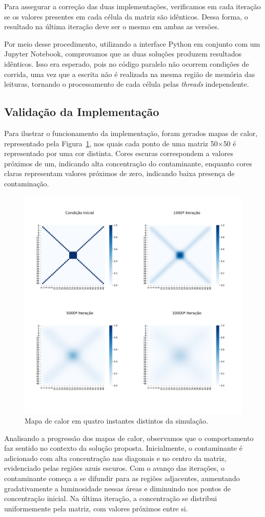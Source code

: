 \documentclass[12pt]{article}
\begin{document}
Para assegurar a correção das duas implementações, verificamos em cada iteração
se os valores presentes em cada célula da matriz são idênticos. Dessa forma, o
resultado na última iteração deve ser o mesmo em ambas as versões.

Por meio desse procedimento, utilizando a interface Python em conjunto com um
Jupyter Notebook, comprovamos que as duas soluções produzem resultados
idênticos. Isso era esperado, pois no código paralelo não ocorrem condições de
corrida, uma vez que a escrita não é realizada na mesma região de memória das
leituras, tornando o processamento de cada célula pelas \textit{threads}
independente.

\subsection{Validação da Implementação}

Para ilustrar o funcionamento da implementação, foram gerados mapas de calor,
representado pela Figura~\ref{fig:heatmap}, nos quais cada ponto de uma matriz
50$\times$50 é representado por uma cor distinta. Cores escuras correspondem a valores
próximos de um, indicando alta concentração do contaminante, enquanto cores
claras representam valores próximos de zero, indicando baixa presença de
contaminação.

\begin{figure}[ht]
  \centering
  \includegraphics[width=.6\textwidth]{figs/heatmap.png}
  \caption{Mapa de calor em quatro instantes distintos da simulação.}\label{fig:heatmap}
\end{figure}

Analisando a progressão dos mapas de calor, observamos que o comportamento faz
sentido no contexto da solução proposta. Inicialmente, o contaminante é
adicionado com alta concentração nas diagonais e no centro da matriz,
evidenciado pelas regiões azuis escuros. Com o avanço das iterações, o
contaminante começa a se difundir para as regiões adjacentes, aumentando
gradativamente a luminosidade nessas áreas e diminuindo nos pontos de
concentração inicial. Na última iteração, a concentração se distribui
uniformemente pela matriz, com valores próximos entre si.
\end{document}
